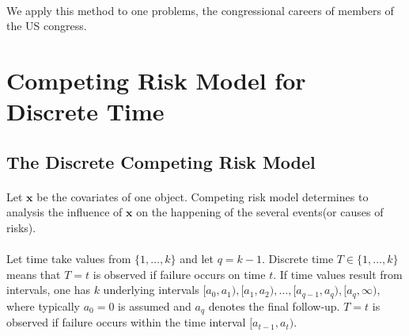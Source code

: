\documentclass[]{article}
\begin{document}
        \paragraph{}We apply this method to one problems, the congressional careers of members of the US congress.
    
    
    
    
    \section{Competing Risk Model for Discrete Time} %
    \subsection{The Discrete Competing Risk Model}
    \paragraph{} Let $\mathbf{x}$ be the covariates of one object. Competing risk model determines to analysis the influence of $\mathbf{x}$ on the happening of the several events(or causes of risks).
    \paragraph{}Let time take values from $\{1,\dots,k\}$ and let $q = k-1$. Discrete time $T \in \{1,\dots,k\}$ means that
    $T = t$ is observed if failure occurs on time $t$. If time values result from intervals, one has $k$ underlying intervals $[a_0, a_1),[a_1, a_2),\dots,[a_{q−1}, a_q), [a_q, \infty)$, where typically $a_0 = 0$ is assumed and $a_q$ denotes the final follow-up. $T = t$ is observed if failure occurs within the time interval $[a_{t−1}, a_t)$.
    
\end{document}

